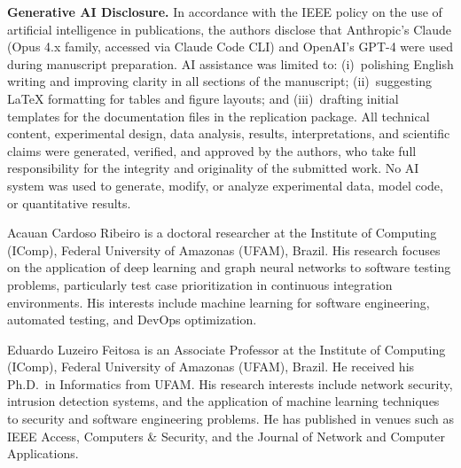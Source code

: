 \documentclass[10pt,journal,compsoc]{IEEEtran}
\begin{document}
\textbf{Generative AI Disclosure.} In accordance with the IEEE policy on
the use of artificial intelligence in publications, the authors disclose
that Anthropic's Claude (Opus 4.x family, accessed via Claude Code CLI)
and OpenAI's GPT-4 were used during manuscript preparation. AI assistance
was limited to: (i)~polishing English writing and improving clarity in
all sections of the manuscript; (ii)~suggesting LaTeX formatting for
tables and figure layouts; and (iii)~drafting initial templates for the
documentation files in the replication package. All technical content,
experimental design, data analysis, results, interpretations, and
scientific claims were generated, verified, and approved by the authors,
who take full responsibility for the integrity and originality of the
submitted work. No AI system was used to generate, modify, or analyze
experimental data, model code, or quantitative results.




\begin{IEEEbiographynophoto}{Acauan Cardoso Ribeiro}
is a doctoral researcher at the Institute of Computing (IComp), Federal
University of Amazonas (UFAM), Brazil. His research focuses on the
application of deep learning and graph neural networks to software testing
problems, particularly test case prioritization in continuous integration
environments. His interests include machine learning for software
engineering, automated testing, and DevOps optimization.
\end{IEEEbiographynophoto}

\begin{IEEEbiographynophoto}{Eduardo Luzeiro Feitosa}
is an Associate Professor at the Institute of Computing (IComp), Federal
University of Amazonas (UFAM), Brazil. He received his Ph.D.\ in
Informatics from UFAM. His research interests include network security,
intrusion detection systems, and the application of machine learning
techniques to security and software engineering problems. He has published
in venues such as IEEE Access, Computers \& Security, and the Journal of
Network and Computer Applications.
\end{IEEEbiographynophoto}
\end{document}

